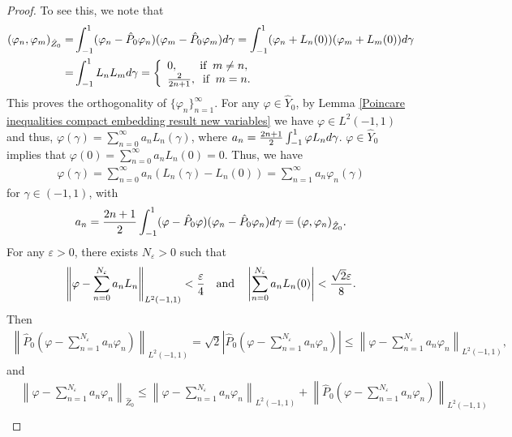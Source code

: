 \documentclass[1 [leqno, 11pt]{amsart}
\numberwithin{equation}{section}
\begin{document}
\begin{CJK*}{GBK}{song}
\begin{proof}
 To see this, we note that
\begin{align}\nonumber
(\varphi_n,\varphi_m)_{\hat Z_0}=&\int_{-1}^1(\varphi_n-\hat P_0 \varphi_n)(\varphi_m-\hat P_0 \varphi_m)d\gamma=\int_{-1}^1(\varphi_n+L_n(0))(\varphi_m+L_m(0))d\gamma\\\nonumber
=&\int_{-1}^1L_nL_md\gamma=\left\{\begin{array}{llll}0,\;\;\;\;\;\;\;\text{if}\;\;m\neq n,\\
{2\over2n+1},\;\;\text{if}\;\;m= n.\end{array}\right.
\end{align}
This proves the orthogonality of  $\{\varphi_n\}_{n=1}^\infty$.
For any $\varphi\in \hat Y_0$, by Lemma \ref{Poincare inequalities compact embedding result  new variables}  we have  $\varphi\in L^2(-1,1)$  and thus, $\varphi(\gamma)=\sum_{n=0}^{\infty}a_nL_n(\gamma)$, where $a_n={{2n+1\over2}}\int_{-1}^1\varphi L_n d\gamma$.
$\varphi\in \hat Y_0$ implies that $\varphi(0)=\sum_{n=0}^{\infty}a_nL_n(0)=0$. Thus, we have \begin{align*}
\varphi(\gamma)=\sum_{n=0}^{\infty}a_n(L_n(\gamma)-L_n(0))=\sum_{n=1}^{\infty}a_n\varphi_n(\gamma)
\end{align*}
 for $\gamma\in(-1,1)$, with
\begin{align*}
a_n={{2n+1\over2}}\int_{-1}^1(\varphi-\hat P_0 \varphi)(\varphi_n-\hat P_0 \varphi_n)d\gamma=(\varphi,\varphi_n)_{\hat Z_0}.
\end{align*}
 For any $\varepsilon>0$, there exists $N_\varepsilon>0$ such that
 \begin{align*}
 \left\|\varphi-\sum_{n=0}^{N_\varepsilon}a_nL_n\right\|_{L^2(-1,1)}<{\varepsilon\over4}\quad
 \text{and}\quad\left|\sum_{n=0}^{N_\varepsilon}a_nL_n(0)\right|<{\sqrt{2}\varepsilon\over8}. \end{align*}
 Then \begin{align*}
 \left\|\hat P_0\left(\varphi-\sum_{n=1}^{N_\varepsilon}a_n\varphi_n\right)\right\|_{L^2(-1,1)}=\sqrt{2}\left|\hat P_0\left(\varphi-\sum_{n=1}^{N_\varepsilon}a_n\varphi_n\right)\right|\leq  \left\| \varphi-\sum_{n=1}^{N_\varepsilon}a_n\varphi_n\right\|_{L^2(-1,1)},
 \end{align*}
 and
 \begin{align}\nonumber
 &\left\|\varphi-\sum_{n=1}^{N_\varepsilon}a_n\varphi_n\right\|_{\hat Z_0}\leq
 \left\|\varphi-\sum_{n=1}^{N_\varepsilon}a_n\varphi_n\right\|_{L^2(-1,1)}+\left\|\hat P_0\left(\varphi-\sum_{n=1}^{N_\varepsilon}a_n\varphi_n\right)\right\|_{L^2(-1,1)}\\\nonumber

\end{align}
\end{proof}
\end{CJK*}
\end{document}
